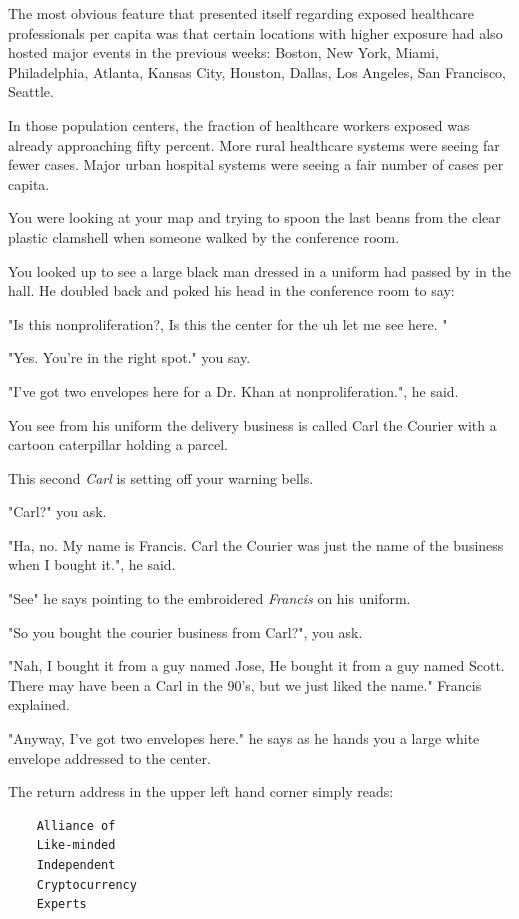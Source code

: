 \documentclass[a5paper, symmetric]{tufte-book}
\begin{document}
The most obvious feature that presented itself regarding exposed healthcare professionals per capita was that certain locations with higher exposure had also hosted major events in the previous weeks: Boston, New York, Miami, Philadelphia, Atlanta, Kansas City, Houston, Dallas, Los Angeles, San Francisco, Seattle.

In those population centers, the fraction of healthcare workers exposed was already approaching fifty percent. More rural healthcare systems were seeing far fewer cases. Major urban hospital systems were seeing a fair number of cases per capita. 

You were looking at your map and trying to spoon the last beans from the clear plastic clamshell when someone walked by the conference room. 

You looked up to see a large black man dressed in a uniform had passed by in the hall. He doubled back and poked his head in the conference room to say: 

"Is this nonproliferation?, Is this the center for the uh let me see here. "

"Yes. You're in the right spot." you say. 

"I've got two envelopes here for a Dr. Khan at nonproliferation.", he said. 

You see from his uniform the delivery business is called Carl the Courier with a cartoon caterpillar holding a parcel. 

This second \textit{Carl} is setting off your warning bells. 

"Carl?" you ask. 

"Ha, no. My name is Francis. Carl the Courier was just the name of the business when I bought it.", he said. 

"See" he says pointing to the embroidered \textit{Francis} on his uniform.

"So you bought the courier business from Carl?", you ask. 

"Nah, I bought it from a guy named Jose, He bought it from a guy named Scott. There may have been a Carl in the 90's, but we just liked the name." Francis explained.

"Anyway, I've got two envelopes here." he says as he hands you a large white envelope addressed to the center.

\newpage
The return address in the upper left hand corner simply reads:

\begin{verbatim}
    Alliance of
    Like-minded
    Independent
    Cryptocurrency
    Experts
\end{verbatim}
\end{document}
